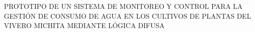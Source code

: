\begin{nohyphens}
	\uppercase{ Prototipo de un Sistema de Monitoreo y Control para la gestión de consumo de agua en los cultivos de plantas del Vivero Michita mediante Lógica Difusa}
\end{nohyphens}
